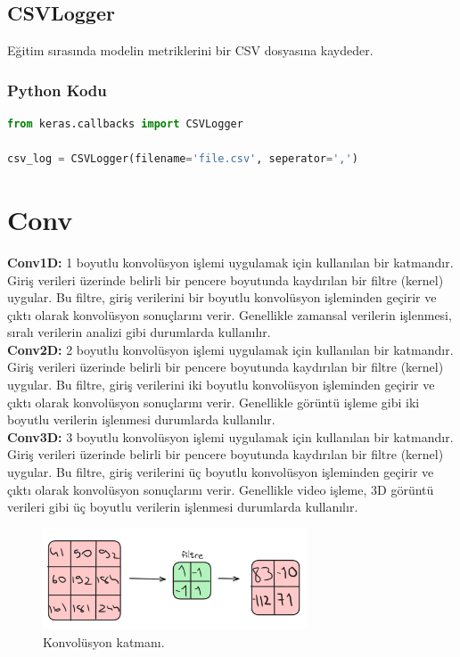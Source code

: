 \newpage

\subsection{CSVLogger}
Eğitim sırasında modelin metriklerini bir CSV dosyasına kaydeder.

\subsubsection{Python Kodu}

\begin{lstlisting}[language=Python]
from keras.callbacks import CSVLogger

csv_log = CSVLogger(filename='file.csv', seperator=',')
\end{lstlisting}

\newpage

\section{Conv}
\textbf{Conv1D:} 1 boyutlu konvolüsyon işlemi uygulamak için kullanılan bir katmandır. Giriş verileri üzerinde belirli bir pencere boyutunda kaydırılan bir filtre (kernel) uygular. Bu filtre, giriş verilerini bir boyutlu konvolüsyon işleminden geçirir ve çıktı olarak konvolüsyon sonuçlarını verir. Genellikle zamansal verilerin işlenmesi, sıralı verilerin analizi gibi durumlarda kullanılır.\\
\textbf{Conv2D:} 2 boyutlu konvolüsyon işlemi uygulamak için kullanılan bir katmandır. Giriş verileri üzerinde belirli bir pencere boyutunda kaydırılan bir filtre (kernel) uygular. Bu filtre, giriş verilerini iki boyutlu konvolüsyon işleminden geçirir ve çıktı olarak konvolüsyon sonuçlarını verir. Genellikle görüntü işleme gibi iki boyutlu verilerin işlenmesi durumlarda kullanılır. \\
\textbf{Conv3D:} 3 boyutlu konvolüsyon işlemi uygulamak için kullanılan bir katmandır. Giriş verileri üzerinde belirli bir pencere boyutunda kaydırılan bir filtre (kernel) uygular. Bu filtre, giriş verilerini üç boyutlu konvolüsyon işleminden geçirir ve çıktı olarak konvolüsyon sonuçlarını verir. Genellikle video işleme, 3D görüntü verileri gibi üç boyutlu verilerin işlenmesi durumlarda kullanılır.

\begin{figure}[h]
    \centering
    \includegraphics[width=0.7\textwidth]{images/conv_layer.png}
    \caption{Konvolüsyon katmanı.}
    \label{fig:enter-label}
\end{figure}

